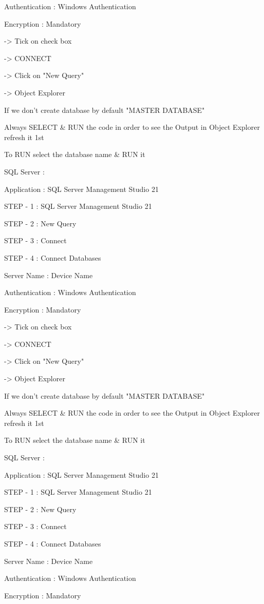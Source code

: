 Authentication : Windows Authentication

Encryption : Mandatory

-> Tick on check box

-> CONNECT

-> Click on "New Query"

-> Object Explorer


If we don't create database by default "MASTER DATABASE"


Always SELECT & RUN the code in order to see the Output in Object Explorer refresh it 1st


To RUN select the database name & RUN it

SQL Server :

Application : SQL Server Management Studio 21

STEP - 1 : SQL Server Management Studio 21

STEP - 2 : New Query

STEP - 3 : Connect

STEP - 4 : Connect Databases


Server Name : Device Name

Authentication : Windows Authentication

Encryption : Mandatory

-> Tick on check box

-> CONNECT

-> Click on "New Query"

-> Object Explorer


If we don't create database by default "MASTER DATABASE"


Always SELECT & RUN the code in order to see the Output in Object Explorer refresh it 1st


To RUN select the database name & RUN it

SQL Server :

Application : SQL Server Management Studio 21

STEP - 1 : SQL Server Management Studio 21

STEP - 2 : New Query

STEP - 3 : Connect

STEP - 4 : Connect Databases


Server Name : Device Name

Authentication : Windows Authentication

Encryption : Mandatory

